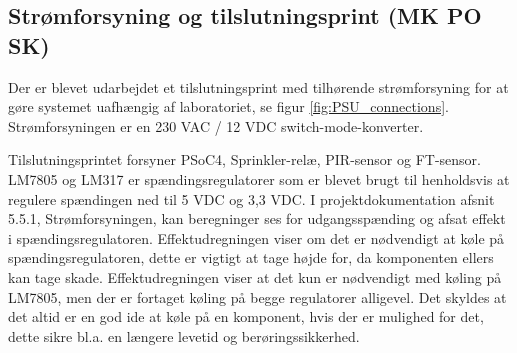 \subsection{Strømforsyning og tilslutningsprint (MK PO SK)}

Der er blevet udarbejdet et tilslutningsprint med tilhørende strømforsyning for at gøre systemet uafhængig af laboratoriet, se figur \ref{fig:PSU_connections}. Strømforsyningen er en 230 VAC / 12 VDC switch-mode-konverter.


Tilslutningsprintet forsyner PSoC4, Sprinkler-relæ, PIR-sensor og FT-sensor. LM7805 og LM317 er spændingsregulatorer som er blevet brugt til henholdsvis at regulere spændingen ned til 5 VDC og 3,3 VDC. I projektdokumentation afsnit 5.5.1, Strømforsyningen, kan beregninger ses for udgangsspænding og afsat effekt i spændingsregulatoren. Effektudregningen viser om det er nødvendigt at køle på spændingsregulatoren, dette er vigtigt at tage højde for, da komponenten ellers kan tage skade. Effektudregningen viser at det kun er nødvendigt med køling på LM7805, men der er fortaget køling på begge regulatorer alligevel. Det skyldes at det altid er en god ide at køle på en komponent, hvis der er mulighed for det, dette sikre bl.a. en længere levetid og berøringssikkerhed.

   